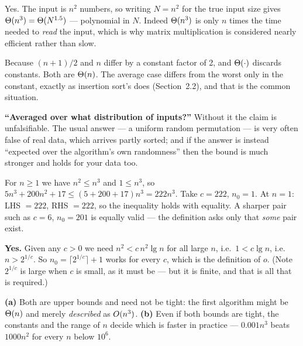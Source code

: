 \begin{ans}
  \item Yes. The input is $n^{2}$ numbers, so writing $N = n^{2}$ for the true
        input size gives $\Theta(n^{3}) = \Theta(N^{1.5})$ --- polynomial in
        $N$. Indeed $\Theta(n^{3})$ is only $n$ times the time needed to
        \emph{read} the input, which is why matrix multiplication is considered
        nearly efficient rather than slow.
  \item Because $(n+1)/2$ and $n$ differ by a constant factor of 2, and
        $\Theta(\cdot)$ discards constants. Both are $\Theta(n)$. The average
        case differs from the worst only in the constant, exactly as insertion
        sort's does (Section~2.2), and that is the common situation.
  \item \textbf{``Averaged over what distribution of inputs?''} Without it the
        claim is unfalsifiable. The usual answer --- a uniform random
        permutation --- is very often false of real data, which arrives partly
        sorted; and if the answer is instead ``expected over the algorithm's
        own randomness'' then the bound is much stronger and holds for your
        data too.
\end{ans}

\begin{ans}
  \item For $n \ge 1$ we have $n^{2} \le n^{3}$ and $1 \le n^{3}$, so
        $5n^{3} + 200n^{2} + 17 \le (5+200+17)n^{3} = 222n^{3}$. Take
        $c = 222$, $n_{0} = 1$. At $n = 1$: LHS $= 222$, RHS $= 222$, so the
        inequality holds with equality. A sharper pair such as $c = 6$,
        $n_{0} = 201$ is equally valid --- the definition asks only that
        \emph{some} pair exist.
  \item \textbf{Yes.} Given any $c > 0$ we need $n^{2} < c\,n^{2}\lg n$ for all
        large $n$, i.e.\ $1 < c\lg n$, i.e.\ $n > 2^{1/c}$. So
        $n_{0} = \lceil 2^{1/c}\rceil + 1$ works for every $c$, which is the
        definition of $o$. (Note $2^{1/c}$ is large when $c$ is small, as it
        must be --- but it is finite, and that is all that is required.)
  \item \textbf{(a)} Both are upper bounds and need not be tight: the first
        algorithm might be $\Theta(n)$ and merely \emph{described} as
        $O(n^{3})$. \textbf{(b)} Even if both bounds are tight, the
        constants and the range of $n$ decide which is faster in practice ---
        $0.001n^{3}$ beats $1000n^{2}$ for every $n$ below $10^{6}$.
\end{ans}

